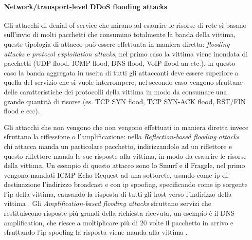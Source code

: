 \paragraph{Network/transport-level DDoS flooding attacks} %
Gli attacchi di denial of service che mirano ad esaurire le risorse di rete si basano sull'invio di molti pacchetti che consumino totalmente la banda della vittima, queste tipologia di attacco può essere effettuata in maniera diretta: \emph{flooding attacks} e \emph{protocol exploitation attacks}, nel primo caso la vittima viene inondata di pacchetti (UDP flood, ICMP flood, DNS flood, VoIP flood an etc.), in questo caso la banda aggregata in uscita di tutti gli attaccanti deve essere superiore a quella del servizio che si vuole interrompere, nel secondo caso vengono sfruttane delle caratteristiche dei protocolli della vittima in modo da consumare una grande quantità di risorse (es. TCP SYN flood, TCP SYN-ACK flood, RST/FIN flood e ecc).

Gli attacchi che non vengono che non vengono effettuati in maniera diretta invece sfruttano la riflessione o l'amplificazione: nella \emph{Reflection-based flooding attacks} chi attacca manda un particolare pacchetto, indirizzandolo ad un riflettore e questo riflettore manda le sue risposte alla vittima, in modo da esaurire le risorse della vittima. Un esempio di questo attacco sono lo Smurf e il Fraggle, nel primo vengono mandati ICMP Echo Request ad una sottorete, usando come ip di destinazione l'indirizzo broadcast e con ip spoofing, specificando come ip sorgente l'ip della vittima, causando la risposta di tutti gli host verso l'indirizzo della vittima \cite{ddos_survey_2}.
Gli \emph{Amplification-based flooding attacks} sfruttano servizi che restituiscono risposte più grandi della richiesta ricevuta, un esempio è il DNS amplification, che riesce a moltiplicare più di 20 volte il pacchetto in arrivo e sfruttando l'ip spoofing la risposta viene manda alla vittima \cite{ddos_survey_1}.
